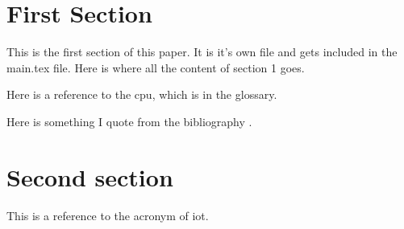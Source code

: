 \section{First Section}

This is the first section of this paper.
It is it's own file and gets included in the main.tex file.
Here is where all the content of section 1 goes.

Here is a reference to the \gls{cpu}, which is in the glossary.

Here is something I quote from the bibliography \cite{turing1937computable}.

\section{Second section}

This is a reference to the acronym of \acrshort{iot}.